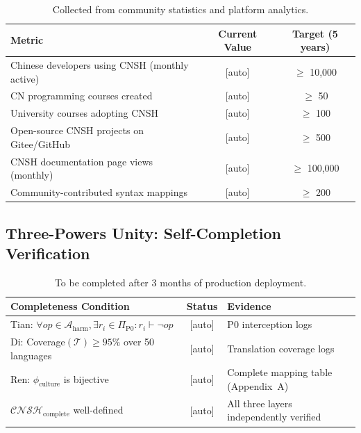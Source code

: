\begin{table}[h]
\centering
\caption{Ren-Layer Cultural Adoption Metrics Template}
\renewcommand{\arraystretch}{1.3}
\begin{tabular}{lcc}
\toprule
\textbf{Metric} & \textbf{Current Value} & \textbf{Target (5 years)} \\
\midrule
Chinese developers using CNSH (monthly active) & [auto] & $\geq$ 10,000 \\
CN programming courses created & [auto] & $\geq$ 50 \\
University courses adopting CNSH & [auto] & $\geq$ 100 \\
Open-source CNSH projects on Gitee/GitHub & [auto] & $\geq$ 500 \\
CNSH documentation page views (monthly) & [auto] & $\geq$ 100,000 \\
Community-contributed syntax mappings & [auto] & $\geq$ 200 \\
\bottomrule
\end{tabular}
\caption*{Collected from community statistics and platform analytics.}
\end{table}

\subsection{Three-Powers Unity: Self-Completion Verification}
\label{app:unity-data}

\begin{table}[h]
\centering
\caption{Three-Powers Unity Verification Template}
\renewcommand{\arraystretch}{1.3}
\begin{tabular}{lcl}
\toprule
\textbf{Completeness Condition} & \textbf{Status} & \textbf{Evidence} \\
\midrule
Tian: $\forall op \in \mathcal{A}_{\text{harm}}, \exists r_i \in \Pi_{\text{P0}}: r_i \vdash \neg op$
  & [auto] & P0 interception logs \\
Di: Coverage$(\mathcal{T}) \geq 95\%$ over 50 languages
  & [auto] & Translation coverage logs \\
Ren: $\phi_{\text{culture}}$ is bijective
  & [auto] & Complete mapping table (Appendix~A) \\
\midrule
$\mathcal{CNSH}_{\text{complete}}$ well-defined
  & [auto] & All three layers independently verified \\
\bottomrule
\end{tabular}
\caption*{To be completed after 3 months of production deployment.}
\end{table}

